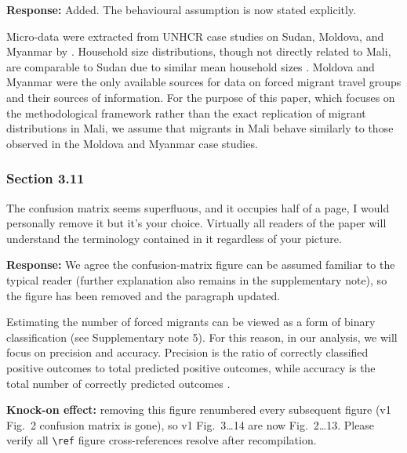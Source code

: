 \documentclass[11pt,a4paper]{article}
\begin{document}
\textbf{Response:} Added. The behavioural assumption is now stated explicitly.

\vspace{0.3cm}
\begin{updatebox}
Micro-data were extracted from UNHCR case studies on Sudan, Moldova, and Myanmar by \citet{He-In}. Household size
distributions, though not directly related to Mali, are comparable to Sudan due to similar mean household sizes
\citep{dhs_sr261,ESRI_AverageHousehold}. Moldova and Myanmar were the only available sources for data on forced migrant
travel groups and their sources of information. For the purpose of this paper, which focuses on the methodological
framework rather than the exact replication of migrant distributions in Mali, we assume that migrants in Mali behave
similarly to those observed in the Moldova and Myanmar case studies.
\end{updatebox}

\subsubsection*{Section 3.11}

\begin{reviewbox}
The confusion matrix seems superfluous, and it occupies half of a page, I would personally remove it but it's your choice. Virtually all readers of the paper will understand the terminology contained in it regardless of your picture.
\end{reviewbox}

\textbf{Response:} We agree the confusion-matrix figure can be assumed familiar to the typical reader (further
explanation also remains in the supplementary note), so the figure has been removed and the paragraph updated.

\vspace{0.3cm}
\begin{updatebox}
Estimating the number of forced migrants can be viewed as a form of binary classification (see Supplementary note 5).
For this reason, in our analysis, we will focus on precision and accuracy. Precision is the ratio of correctly
classified positive outcomes to total predicted positive outcomes, while accuracy is the total number of correctly
predicted outcomes \citep{confusion}.
\end{updatebox}

\vspace{0.2cm}
\begin{flagbox}
\textbf{Knock-on effect:} removing this figure renumbered every subsequent figure (v1 Fig.~2 confusion matrix
is gone), so v1 Fig.~3\ldots{}14 are now Fig.~2\ldots{}13. Please verify all \texttt{\textbackslash ref} figure
cross-references resolve after recompilation.
\end{flagbox}
\end{document}
